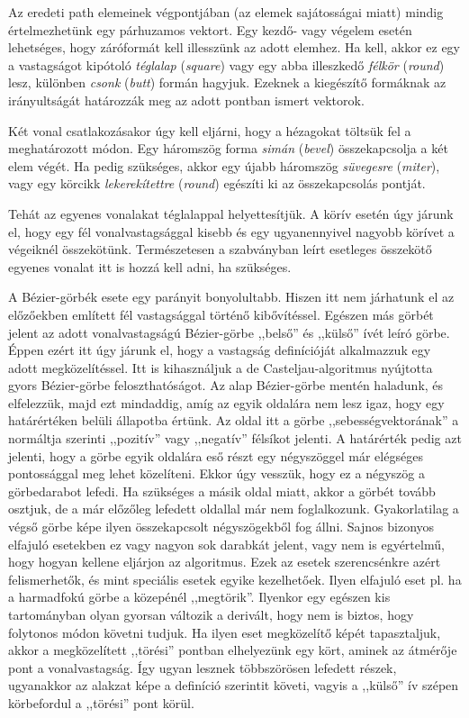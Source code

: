 \documentclass[12pt]{report}
\theoremstyle{definition}
\newcommand{\inenglish}[1]{\textsl{#1}}
\begin{document}
Az eredeti path elemeinek végpontjában (az elemek sajátosságai miatt) mindig
értelmezhetünk egy párhuzamos vektort. Egy kezdő- vagy végelem esetén
lehetséges, hogy záróformát kell illesszünk az adott elemhez. Ha kell, akkor ez
egy a vastagságot kipótoló \emph{téglalap} (\inenglish{square}) vagy egy abba
illeszkedő \emph{félkör} (\inenglish{round}) lesz, különben \emph{csonk}
(\inenglish{butt}) formán hagyjuk. Ezeknek a kiegészítő formáknak az
irányultságát határozzák meg az adott pontban ismert vektorok.

Két vonal csatlakozásakor úgy kell eljárni, hogy a hézagokat töltsük fel a
meghatározott módon. Egy háromszög forma \emph{simán} (\inenglish{bevel})
összekapcsolja a két elem végét. Ha pedig szükséges, akkor egy újabb háromszög
\emph{süvegesre} (\inenglish{miter}), vagy egy körcikk \emph{lekerekítettre}
(\inenglish{round}) egészíti ki az összekapcsolás pontját.

Tehát az egyenes vonalakat téglalappal helyettesítjük. A körív esetén úgy
járunk el, hogy egy fél vonalvastagsággal kisebb és egy ugyanennyivel nagyobb
körívet a végeiknél összekötünk. Természetesen a szabványban leírt esetleges
összekötő egyenes vonalat itt is hozzá kell adni, ha szükséges.

A Bézier-görbék esete egy parányit bonyolultabb. Hiszen itt nem járhatunk el az
előzőekben említett fél vastagsággal történő kibővítéssel. Egészen más görbét
jelent az adott vonalvastagságú Bézier-görbe ,,belső'' és ,,külső'' ívét leíró
görbe. Éppen ezért itt úgy járunk el, hogy a vastagság definícióját alkalmazzuk
egy adott megközelítéssel. Itt is kihasználjuk a de Casteljau-algoritmus
nyújtotta gyors Bézier-görbe feloszthatóságot. Az alap Bézier-görbe mentén
haladunk, és elfelezzük, majd ezt mindaddig, amíg az egyik oldalára nem lesz
igaz, hogy egy határértéken belüli állapotba értünk. Az oldal itt a görbe
,,sebességvektorának'' a normáltja szerinti ,,pozitív'' vagy ,,negatív''
félsíkot jelenti. A határérték pedig azt jelenti, hogy a görbe egyik oldalára
eső részt egy négyszöggel már elégséges pontossággal meg lehet közelíteni.
Ekkor úgy vesszük, hogy ez a négyszög a görbedarabot lefedi. Ha szükséges a
másik oldal miatt, akkor a görbét tovább osztjuk, de a már előzőleg lefedett
oldallal már nem foglalkozunk. Gyakorlatilag a végső görbe képe ilyen
összekapcsolt négyszögekből fog állni. Sajnos bizonyos elfajuló esetekben ez
vagy nagyon sok darabkát jelent, vagy nem is egyértelmű, hogy hogyan kellene
eljárjon az algoritmus. Ezek az esetek szerencsénkre azért felismerhetők, és
mint speciális esetek egyike kezelhetőek. Ilyen elfajuló eset pl. ha a
harmadfokú görbe a közepénél ,,megtörik''. Ilyenkor egy egészen kis
tartományban olyan gyorsan változik a derivált, hogy nem is biztos, hogy
folytonos módon követni tudjuk. Ha ilyen eset megközelítő képét tapasztaljuk,
akkor a megközelített ,,törési'' pontban elhelyezünk egy kört, aminek az
átmérője pont a vonalvastagság. Így ugyan lesznek többszörösen lefedett részek,
ugyanakkor az alakzat képe a definíció szerintit követi, vagyis a ,,külső'' ív
szépen körbefordul a ,,törési'' pont körül.
\end{document}
